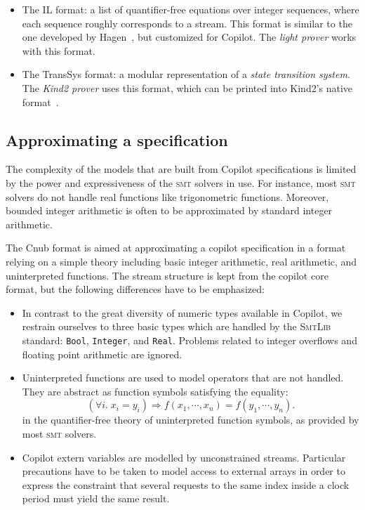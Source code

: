 \begin{itemize}
\item
  The {IL} format: a list
  of quantifier-free equations over integer sequences, where each sequence
  roughly corresponds to a stream.   This
format is similar to the one developed by Hagen~\cite{HagenPhD}, but customized for Copilot.   The \emph{light prover} works with this
  format.
\item The {TransSys} format: a modular representation of a
  \emph{state transition system}. The \emph{Kind2 prover} uses this
  format, which can be printed into Kind2's native format~\cite{kind}.
\end{itemize}

\subsection{Approximating a specification}

The complexity of the models that are built from Copilot specifications is
limited by the power and expressiveness of the \textsc{smt} solvers in use. For instance,
most \textsc{smt} solvers do not handle real functions like trigonometric functions. Moreover, bounded integer arithmetic is often to be approximated by standard integer arithmetic.

The {Cnub} format is aimed at approximating a copilot specification in a format relying on a simple theory including basic integer arithmetic, real arithmetic, and uninterpreted functions. The stream structure is kept from the copilot core format, but the following differences have to be emphasized:

\begin{itemize}
\item In contrast to the great diversity of numeric types available in Copilot, we restrain ourselves to three basic types which are handled by the \textsc{SmtLib} standard: \texttt{Bool}, \texttt{Integer}, and \texttt{Real}. Problems related to integer overflows and floating point arithmetic are ignored.



\item {Uninterpreted functions} are used to model operators that are not
  handled. They are abstract as function symbols satisfying the
  equality: $$ \left( \forall i . \; x_i = y_i \right) \Longrightarrow f(x_1,
  \cdots, x_n) = f(y_1, \cdots, y_n). $$ in the quantifier-free theory of
  uninterpreted function symbols, as provided by most \textsc{smt} solvers.

\item Copilot extern variables are modelled by unconstrained streams. Particular precautions have to be taken to model access to external arrays in order to express the constraint that several requests to the same index inside a clock period must yield the same result.

\end{itemize}

